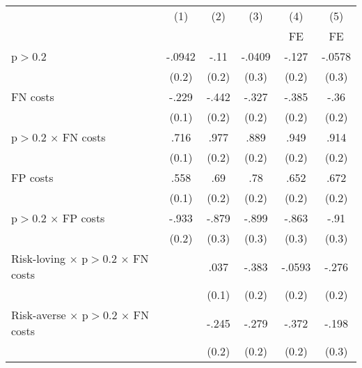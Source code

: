 \begin{tabular}{l*{5}{c}}
\hline\hline
                &\multicolumn{1}{c}{(1)}&\multicolumn{1}{c}{(2)}&\multicolumn{1}{c}{(3)}&\multicolumn{1}{c}{(4)}&\multicolumn{1}{c}{(5)}\\
                &\multicolumn{1}{c}{}&\multicolumn{1}{c}{}&\multicolumn{1}{c}{}&\multicolumn{1}{c}{FE}&\multicolumn{1}{c}{FE}\\
\hline
p$>$0.2         &   -.0942         &     -.11         &   -.0409         &    -.127         &   -.0578         \\
                &    (0.2)         &    (0.2)         &    (0.3)         &    (0.2)         &    (0.3)         \\
FN costs        &    -.229\sym{*}  &    -.442\sym{*}  &    -.327         &    -.385\sym{*}  &     -.36\sym{*}  \\
                &    (0.1)         &    (0.2)         &    (0.2)         &    (0.2)         &    (0.2)         \\
p$>$0.2 $\times$ FN costs&     .716\sym{***}&     .977\sym{***}&     .889\sym{***}&     .949\sym{***}&     .914\sym{***}\\
                &    (0.1)         &    (0.2)         &    (0.2)         &    (0.2)         &    (0.2)         \\
FP costs        &     .558\sym{***}&      .69\sym{***}&      .78\sym{***}&     .652\sym{***}&     .672\sym{***}\\
                &    (0.1)         &    (0.2)         &    (0.2)         &    (0.2)         &    (0.2)         \\
p$>$0.2 $\times$ FP costs&    -.933\sym{***}&    -.879\sym{***}&    -.899\sym{***}&    -.863\sym{***}&     -.91\sym{***}\\
                &    (0.2)         &    (0.3)         &    (0.3)         &    (0.3)         &    (0.3)         \\
Risk-loving $\times$ p$>$0.2 $\times$ FN costs&                  &     .037         &    -.383         &   -.0593         &    -.276         \\
                &                  &    (0.1)         &    (0.2)         &    (0.2)         &    (0.2)         \\
Risk-averse $\times$ p$>$0.2 $\times$ FN costs&                  &    -.245         &    -.279         &    -.372\sym{**} &    -.198         \\
                &                  &    (0.2)         &    (0.2)         &    (0.2)         &    (0.3)         \\

\end{tabular}
